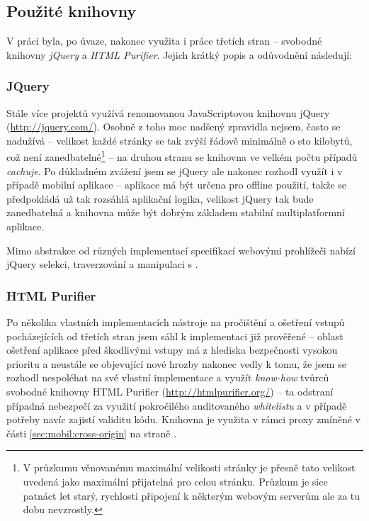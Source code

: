 \subsection{Použité knihovny}
V práci byla, po úvaze, nakonec využita i práce třetích stran -- svobodné knihovny \emph{jQuery} a \emph{HTML Purifier}. Jejich krátký popis a odůvodnění následují:

\subsubsection{JQuery}
Stále více projektů využívá renomovanou JavaScriptovou knihovnu jQuery (\url{http://jquery.com/}). Osobně z toho moc nadšený zpravidla nejsem, často se nadužívá -- velikost každé stránky se tak zvýší řádově minimálně o sto kilobytů, což není zanedbatelné\footnote{V průzkumu \cite{PagesizeUseit} věnovanému maximální velikosti stránky je přesně tato velikost uvedená jako maximální přijatelná pro celou stránku. Průzkum je sice patnáct let starý, rychlosti připojení k některým webovým serverům ale za tu dobu nevzrostly.} -- na druhou stranu se knihovna ve velkém počtu případů \textit{cachuje}. Po důkladném zvážení jsem se jQuery ale nakonec rozhodl využít i v případě mobilní aplikace -- aplikace má být určena pro offline použití, takže se předpokládá už tak rozsáhlá aplikační logika, velikost jQuery tak bude zanedbatelná a knihovna může být dobrým základem stabilní multiplatformní aplikace.

Mimo abstrakce od různých implementací specifikací webovými prohlížeči nabízí jQuery selekci, traverzování a manipulaci s .

\subsubsection{HTML Purifier}
Po několika vlastních implementacích nástroje na pročištění a ošetření  vstupů pocházejících od třetích stran jsem sáhl k implementaci již prověřené -- oblast ošetření aplikace před škodlivými vstupy má z hlediska bezpečnosti vysokou prioritu a neustále se objevující nové hrozby nakonec vedly k tomu, že jsem se rozhodl nespoléhat na své vlastní implementace a využít \textit{know-how} tvůrců svobodné  knihovny HTML Purifier (\url{http://htmlpurifier.org/}) -- ta odstraní případná nebezpečí za využití pokročilého auditovaného \textit{whitelistu} a v případě potřeby navíc zajistí validitu kódu. Knihovna je využita v rámci proxy zmíněné v části \ref{sec:mobil:cross-origin} na straně \pageref{sec:mobil:cross-origin}.


